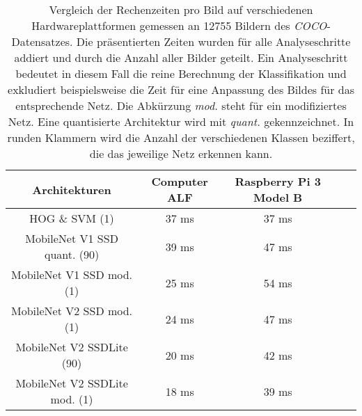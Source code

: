 \begin{table}[H]
	\caption{Vergleich der Rechenzeiten pro Bild auf verschiedenen Hardwareplattformen gemessen an 12755 Bildern des \textit{COCO}-Datensatzes. Die präsentierten Zeiten wurden für alle Analyseschritte addiert und durch die Anzahl aller Bilder geteilt. Ein Analyseschritt bedeutet in diesem Fall die reine Berechnung der Klassifikation und exkludiert beispielsweise die Zeit für eine Anpassung des Bildes für das entsprechende Netz. Die Abkürzung \textit{mod.} steht für ein modifiziertes Netz. Eine quantisierte Architektur wird mit \textit{quant.} gekennzeichnet. In runden Klammern wird die Anzahl der verschiedenen Klassen beziffert, die das jeweilige Netz erkennen kann.    }
	\begin{center}
		
	\begin{tabular}{|c|c|c|c|c|}
		\hline
		\multicolumn{1}{|c|}{Architekturen} & \multicolumn{1}{c|}{Computer ALF}  & \multicolumn{1}{c|}{Raspberry Pi 3 Model B} \\ \hline
		HOG \& SVM (1)					&37 ms 				& 37 ms 	 \\
		MobileNet V1 SSD quant. (90)	&39	ms				&47	ms	 	 \\
		MobileNet V1 SSD mod. (1)		&25 ms				& 54 ms \\
		MobileNet V2 SSD mod. (1)		&24 ms 		 		&47 ms \\
		MobileNet V2 SSDLite (90)		&20 ms	 		&42 ms	 \\
		MobileNet V2 SSDLite mod. (1)	&18 ms					&39 ms \\
		
		\hline
	\end{tabular}
	\end{center}

	\label{fig: zeitentab}
\end{table}